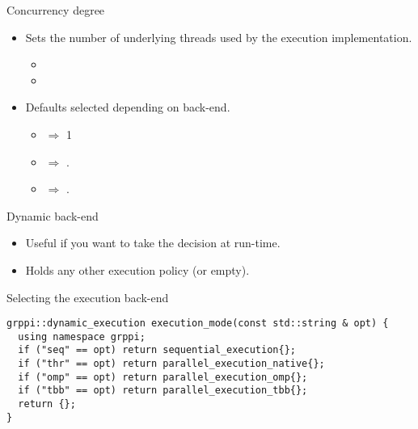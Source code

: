 \begin{frame}[t]{Concurrency degree}
\begin{itemize}
  \item Sets the number of underlying threads used by the execution implementation.
    \begin{itemize}
      \item {}
      \item {}
    \end{itemize}

  \vfill
  \item Defaults selected depending on back-end.
    \begin{itemize}
      \item {} $\Rightarrow$ 1
      \item {} $\Rightarrow$ .
      \item {} $\Rightarrow$ .
    \end{itemize}

\end{itemize}
\end{frame}

\begin{frame}[t,fragile]{Dynamic back-end}
\begin{itemize}
  \item Useful if you want to take the decision at run-time.
  \item Holds any other execution policy (or empty).
\end{itemize}
\vfill\pause
\begin{block}{Selecting the execution back-end}
\begin{lstlisting}
grppi::dynamic_execution execution_mode(const std::string & opt) {
  using namespace grppi;
  if ("seq" == opt) return sequential_execution{};
  if ("thr" == opt) return parallel_execution_native{};
  if ("omp" == opt) return parallel_execution_omp{};
  if ("tbb" == opt) return parallel_execution_tbb{};
  return {};
}
\end{lstlisting}
\end{block}
\end{frame}

